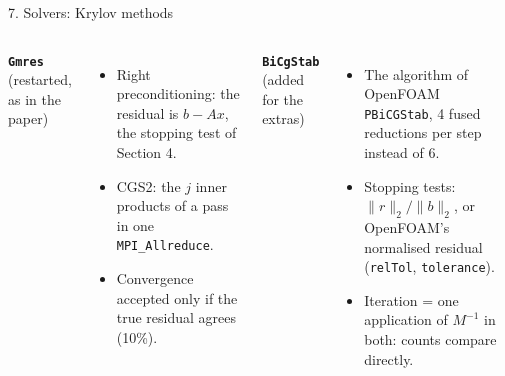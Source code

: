 \documentclass[aspectratio=169,10pt]{beamer}
\newcommand{\code}[1]{\texttt{#1}}
\newcommand\Wsolv{{-16}{-19}{85}{9}}
\newcommand\mapsec[2]{\expandafter\cmsection#1{#2}}
\newcommand\mapbadge[1]{%
  \begin{tikzpicture}[remember picture,overlay]
    \node[anchor=north east,fill=white,rounded corners=1.2pt,inner sep=0.9pt]
      at ($(current page.north east)+(-1.8mm,-0.75mm)$) {\expandafter\cmthumb#1{17mm}};
  \end{tikzpicture}}
\begin{document}
\begin{frame}{7. Solvers: Krylov methods}
  \centering
  \mapsec\Wsolv{0.62\textwidth}\\[1mm]
  \begin{columns}[c,onlytextwidth]
    \small
    \textbf{\code{Gmres}} (restarted, as in the paper)
    \begin{itemize}
      \item \alert{Right} preconditioning: the residual is $b-Ax$, the stopping test of Section 4.
      \item CGS2: the $j$ inner products of a pass in \alert{one} \code{MPI\_Allreduce}.
      \item Convergence accepted only if the \alert{true} residual agrees (10\%).
    \end{itemize}
    \small
    \textbf{\code{BiCgStab}} (added for the extras)
    \begin{itemize}
      \item The algorithm of OpenFOAM \code{PBiCGStab}, 4 fused reductions per step instead of 6.
      \item Stopping tests: $\|r\|_2/\|b\|_2$, or OpenFOAM's normalised residual (\code{relTol}, \code{tolerance}).
      \item Iteration = one application of $M^{-1}$ in both: counts compare directly.
    \end{itemize}
  \end{columns}
\end{frame}
\end{document}
